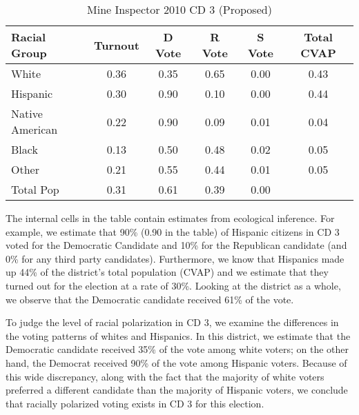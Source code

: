 \documentclass[12pt]{article}
\begin{document}
\begin{table}[ht]
\begin{center}
\caption{\label{smine_cvap_cd_3_ex}Mine Inspector 2010 CD 3 (Proposed)}
\begin{tabular}{lccccc}
  \hline
Racial Group & Turnout & D Vote & R Vote & S Vote & Total CVAP\\ 
  \hline
White & 0.36 & 0.35 & 0.65 & 0.00 & 0.43 \\ 
  Hispanic & 0.30 & 0.90 & 0.10 & 0.00 & 0.44 \\ 
  Native American & 0.22 & 0.90 & 0.09 & 0.01 & 0.04 \\ 
  Black & 0.13 & 0.50 & 0.48 & 0.02 & 0.05 \\ 
  Other & 0.21 & 0.55 & 0.44 & 0.01 & 0.05 \\ 
  Total Pop & 0.31 & 0.61 & 0.39 & 0.00 &  \\ 
   \hline
\end{tabular}
\end{center}
\end{table}

The internal cells in the table contain estimates from ecological
inference. For example, we estimate that 90\% (0.90 in the table) of
Hispanic citizens in CD 3 voted for the Democratic Candidate and 10\%
for the Republican candidate (and 0\% for any third party candidates).
Furthermore, we know that Hispanics made up 44\% of the district's
total population (CVAP) and we estimate that they turned out for the
election at a rate of 30\%.  Looking at the district as a whole, we
observe that the Democratic candidate received 61\% of the vote. 



To judge the level of racial polarization in CD 3, we examine the
differences in the voting patterns of whites and Hispanics. In this
district, we estimate that the Democratic candidate received 35\% of
the vote among white voters; on the other hand, the Democrat received
90\% of the vote among Hispanic voters. Because of this wide
discrepancy, along with the fact that the majority of white voters
preferred a different candidate than the majority of Hispanic voters,
we conclude that racially polarized voting exists in CD 3 for this
election.
\end{document}

